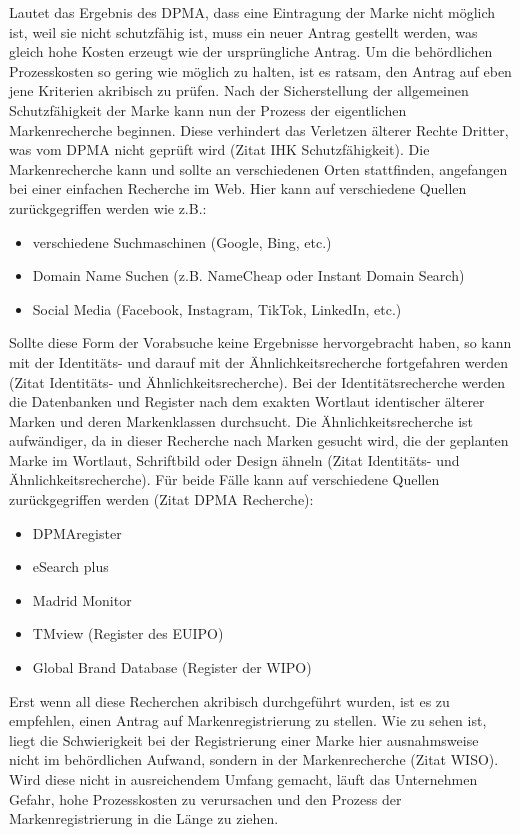 Lautet das Ergebnis des DPMA, dass eine Eintragung der Marke nicht möglich ist, weil sie nicht schutzfähig ist, muss ein neuer Antrag gestellt werden, was gleich hohe Kosten erzeugt wie der ursprüngliche Antrag. Um die behördlichen Prozesskosten so gering wie möglich zu halten, ist es ratsam, den Antrag auf eben jene Kriterien akribisch zu prüfen. Nach der Sicherstellung der allgemeinen Schutzfähigkeit der Marke kann nun der Prozess der eigentlichen Markenrecherche beginnen. Diese verhindert das Verletzen älterer Rechte Dritter, was vom DPMA nicht geprüft wird (Zitat IHK Schutzfähigkeit). Die Markenrecherche kann und sollte an verschiedenen Orten stattfinden, angefangen bei einer einfachen Recherche im Web. Hier kann auf verschiedene Quellen zurückgegriffen werden wie z.B.:
\begin{itemize}
    \item verschiedene Suchmaschinen (Google, Bing, etc.)
    \item Domain Name Suchen (z.B. NameCheap oder Instant Domain Search)
    \item Social Media (Facebook, Instagram, TikTok, LinkedIn, etc.)
\end{itemize}
    
Sollte diese Form der Vorabsuche keine Ergebnisse hervorgebracht haben, so kann mit der Identitäts- und darauf mit der Ähnlichkeitsrecherche fortgefahren werden (Zitat Identitäts- und Ähnlichkeitsrecherche). Bei der Identitätsrecherche werden die Datenbanken und Register nach dem exakten Wortlaut identischer älterer Marken und deren Markenklassen durchsucht. Die Ähnlichkeitsrecherche ist aufwändiger, da in dieser Recherche nach Marken gesucht wird, die der geplanten Marke im Wortlaut, Schriftbild oder Design ähneln (Zitat Identitäts- und Ähnlichkeitsrecherche). Für beide Fälle kann auf verschiedene Quellen zurückgegriffen werden (Zitat DPMA Recherche): 

\begin{itemize}
    \item DPMAregister
    \item eSearch plus
    \item Madrid Monitor
    \item TMview (Register des EUIPO)
    \item Global Brand Database (Register der WIPO)
\end{itemize}

Erst wenn all diese Recherchen akribisch durchgeführt wurden, ist es zu empfehlen, einen Antrag auf Markenregistrierung zu stellen. Wie zu sehen ist, liegt die Schwierigkeit bei der Registrierung einer Marke hier ausnahmsweise nicht im behördlichen Aufwand, sondern in der Markenrecherche (Zitat WISO). Wird diese nicht in ausreichendem Umfang gemacht, läuft das Unternehmen Gefahr, hohe Prozesskosten zu verursachen und den Prozess der Markenregistrierung in die Länge zu ziehen.